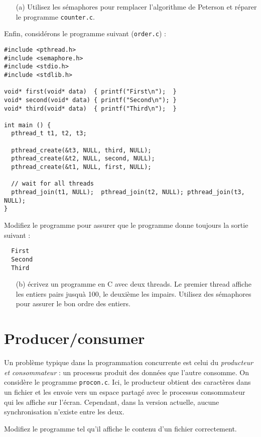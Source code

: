 \documentclass[11pt]{article}
\begin{document}
\begin{enumerate}
\item[(a)] Utilisez les sémaphores pour remplacer l'algorithme de Peterson et réparer le programme \texttt{counter.c}.
\end{enumerate}

Enfin, considérons le programme suivant (\texttt{order.c}) :
\begin{verbatim}
#include <pthread.h>
#include <semaphore.h>
#include <stdio.h>
#include <stdlib.h>

void* first(void* data)  { printf("First\n");  }
void* second(void* data) { printf("Second\n"); }
void* third(void* data)  { printf("Third\n");  }

int main () {
  pthread_t t1, t2, t3;
  
  pthread_create(&t3, NULL, third, NULL);
  pthread_create(&t2, NULL, second, NULL);
  pthread_create(&t1, NULL, first, NULL);

  // wait for all threads
  pthread_join(t1, NULL);  pthread_join(t2, NULL); pthread_join(t3, NULL);
}
\end{verbatim}
Modifiez le programme pour assurer que le programme donne toujours la
 sortie suivant :
\begin{verbatim}
  First
  Second
  Third
\end{verbatim}

\begin{enumerate}
\item[(b)]
 écrivez un programme en C avec deux threads. Le premier thread
 affiche les entiers pairs jusquà 100, le deuxième les impairs.
 Utilisez des sémaphores pour assurer le bon ordre des entiers.
\end{enumerate}

\section{Producer/consumer}

Un problème typique dans la programmation concurrente est celui du
\emph{producteur et consommateur} : un processus produit des données
que l'autre consomme. On considère le programme 
\texttt{procon.c}. Ici, le producteur obtient des caractères dans un
fichier et les envoie vers un espace partagé avec le processus consommateur
qui les affiche sur l'écran. Cependant, dans la version actuelle,
aucune synchronisation n'existe entre les deux.

Modifiez le programme tel qu'il affiche le contenu d'un fichier correctement.
\end{document}
